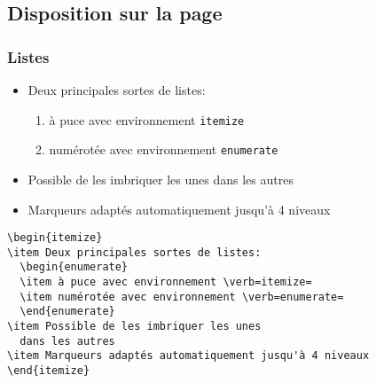 \subsection{Disposition sur la page}

\begin{frame}[fragile]
  \frametitle{Listes}
  \begin{itemize}
  \item Deux principales sortes de listes:
    \begin{enumerate}
    \item \alert{à puce} avec environnement \verb=itemize=
    \item \alert{numérotée} avec environnement \verb=enumerate=
    \end{enumerate}
  \item Possible de les imbriquer les unes dans les autres
  \item Marqueurs adaptés automatiquement jusqu'à 4 niveaux
  \end{itemize}
  \pause

\begin{lstlisting}
\begin{itemize}
\item Deux principales sortes de listes:
  \begin{enumerate}
  \item à puce avec environnement \verb=itemize=
  \item numérotée avec environnement \verb=enumerate=
  \end{enumerate}
\item Possible de les imbriquer les unes
  dans les autres
\item Marqueurs adaptés automatiquement jusqu'à 4 niveaux
\end{itemize}
\end{lstlisting}
\end{frame}

